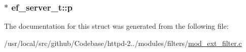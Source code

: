 \subsubsection[{\texorpdfstring{p}{p}}]{$\ast$ ef\+\_\+server\+\_\+t\+::p}\hypertarget{structef__server__t_aa41c514610679086e4d24989d8e6c54c}{}\label{structef__server__t_aa41c514610679086e4d24989d8e6c54c}


The documentation for this struct was generated from the following file\+:\begin{DoxyCompactItemize}
\item 
/usr/local/src/github/\+Codebase/httpd-\/2../modules/filters/\hyperlink{mod__ext__filter_8c}{mod\+\_\+ext\+\_\+filter.\+c}\end{DoxyCompactItemize}
